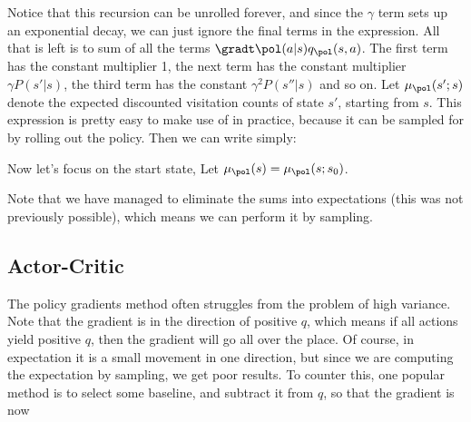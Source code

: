 \documentclass[12pt]{article}
\begin{document}

Notice that this recursion can be unrolled forever, and since the $\gamma$ term sets up an exponential decay, we can just ignore the final terms in the expression. All that is left is to sum of all the terms $\gradt \pol(a|s) q_{\pol}(s, a)$. The first term has the constant multiplier 1, the next term has the constant multiplier $\gamma P(s'|s)$, the third term has the constant $\gamma^2 P(s''|s)$ and so on. Let $\mu_{\pol}(s';s)$ denote the expected discounted visitation counts of state $s'$, starting from $s$. This expression is pretty easy to make use of in practice, because it can be sampled for by rolling out the policy. Then we can write simply:


Now let's focus on the start state, Let $\mu_{\pol}(s) = \mu_{\pol}(s;s_0)$.


Note that we have managed to eliminate the sums into expectations (this was not previously possible), which means we can perform it by sampling.

\subsection{Actor-Critic}

The policy gradients method often struggles from the problem of high variance. Note that the gradient is in the direction of positive $q$, which means if all actions yield positive $q$, then the gradient will go all over the place. Of course, in expectation it is a small movement in one direction, but since we are computing the expectation by sampling, we get poor results. To counter this, one popular method is to select some baseline, and subtract it from $q$, so that the gradient is now
\end{document}

